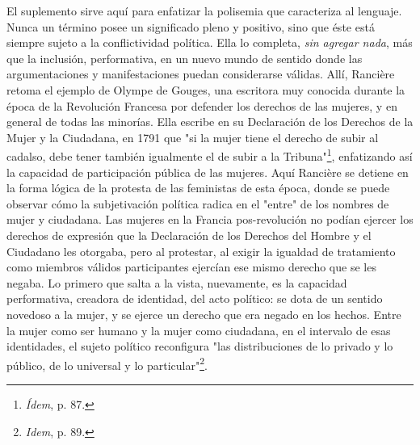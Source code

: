 \documentclass{book}
\begin{document}
El suplemento sirve aquí para enfatizar la polisemia que caracteriza al
lenguaje. Nunca un término posee un significado pleno y positivo, sino
que éste está siempre sujeto a la conflictividad política. Ella lo
completa, \emph{sin agregar nada}, más que la inclusión, performativa,
en un nuevo mundo de sentido donde las argumentaciones y manifestaciones
puedan considerarse válidas. Allí, Rancière retoma el ejemplo de Olympe
de Gouges, una escritora muy conocida durante la época de la Revolución
Francesa por defender los derechos de las mujeres, y en general de todas
las minorías. Ella escribe en su Declaración de los Derechos de la Mujer
y la Ciudadana, en 1791 que "si la mujer tiene el derecho de subir al
cadalso, debe tener también igualmente el de subir a la
Tribuna"\footnote{\emph{Ídem}, p. 87.}, enfatizando así la capacidad de
participación pública de las mujeres. Aquí Rancière se detiene en la
forma lógica de la protesta de las feministas de esta época, donde se
puede observar cómo la subjetivación política radica en el "entre" de
los nombres de mujer y ciudadana. Las mujeres en la Francia
pos-revolución no podían ejercer los derechos de expresión que la
Declaración de los Derechos del Hombre y el Ciudadano les otorgaba, pero
al protestar, al exigir la igualdad de tratamiento como miembros válidos
participantes ejercían ese mismo derecho que se les negaba. Lo primero
que salta a la vista, nuevamente, es la capacidad performativa, creadora
de identidad, del acto político: se dota de un sentido novedoso a la
mujer, y se ejerce un derecho que era negado en los hechos. Entre la
mujer como ser humano y la mujer como ciudadana, en el intervalo de esas
identidades, el sujeto político reconfigura "las distribuciones de lo
privado y lo público, de lo universal y lo particular"\footnote{\emph{Idem},
  p. 89.}.
\end{document}
